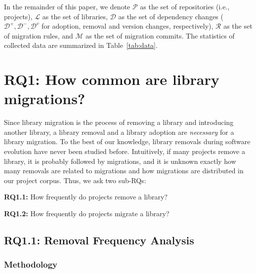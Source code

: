 \documentclass[sigconf, screen]{acmart}
\begin{document}
In the remainder of this paper, we denote $\mathcal{P}$ as the set of repositories (i.e., projects), $\mathcal{L}$ as the set of libraries, $\mathcal{D}$ as the set of dependency changes ($\mathcal{D}^+, \mathcal{D}^-, \mathcal{D}^v$ for adoption, removal and version changes, respectively), $\mathcal{R}$ as the set of migration rules, and $\mathcal{M}$ as the set of migration commits. The statistics of collected data are summarized in Table~\ref{tab:data}.

\section{RQ1: How common are library migrations?}

Since library migration is the process of removing a library and introducing another library, a library removal and a library adoption are \textit{necessary} for a library migration.
To the best of our knowledge, library removals during software evolution have never been studied before.
Intuitively, %
if many projects remove a library, it is probably followed by migrations,
and
it is unknown exactly how many removals are related to migrations and how migrations are distributed in our project corpus.
Thus, we ask two sub-RQs:

\textbf{RQ1.1:} How frequently do projects remove a library?

\textbf{RQ1.2:} How frequently do projects migrate a library? 

\subsection{RQ1.1: Removal Frequency Analysis}

\subsubsection{Methodology}
\end{document}
